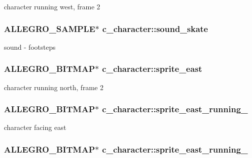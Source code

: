 character running west, frame 2 \hypertarget{classc__character_a728e0633d8f62df9f08bcce7bea03cee}{
\subsubsection[{sound\-\_\-skate}]{\setlength{\rightskip}{0pt plus 5cm}A\-L\-L\-E\-G\-R\-O\-\_\-\-S\-A\-M\-P\-L\-E$\ast$ c\-\_\-character\-::sound\-\_\-skate\hspace{0.3cm}{\ttfamily [protected]}}}\label{classc__character_a728e0633d8f62df9f08bcce7bea03cee}
sound -\/ footsteps \hypertarget{classc__character_afabf5a5d776707387be05162e7389aa1}{
\subsubsection[{sprite\-\_\-east}]{\setlength{\rightskip}{0pt plus 5cm}A\-L\-L\-E\-G\-R\-O\-\_\-\-B\-I\-T\-M\-A\-P$\ast$ c\-\_\-character\-::sprite\-\_\-east\hspace{0.3cm}{\ttfamily [protected]}}}\label{classc__character_afabf5a5d776707387be05162e7389aa1}
character running north, frame 2 \hypertarget{classc__character_ae6f68b43b39ceac377631aa406b43a0b}{
\subsubsection[{sprite\-\_\-east\-\_\-running\-\_\-1}]{\setlength{\rightskip}{0pt plus 5cm}A\-L\-L\-E\-G\-R\-O\-\_\-\-B\-I\-T\-M\-A\-P$\ast$ c\-\_\-character\-::sprite\-\_\-east\-\_\-running\-\_\hspace{0.3cm}{\ttfamily [protected]}}}\label{classc__character_ae6f68b43b39ceac377631aa406b43a0b}
character facing east \hypertarget{classc__character_a563e59c84f1cf673bcd1d4b5179727c1}{
\subsubsection[{sprite\-\_\-east\-\_\-running\-\_\-2}]{\setlength{\rightskip}{0pt plus 5cm}A\-L\-L\-E\-G\-R\-O\-\_\-\-B\-I\-T\-M\-A\-P$\ast$ c\-\_\-character\-::sprite\-\_\-east\-\_\-running\-\_\hspace{0.3cm}{\ttfamily [protected]}}}\label{classc__character_a563e59c84f1cf673bcd1d4b5179727c1}
